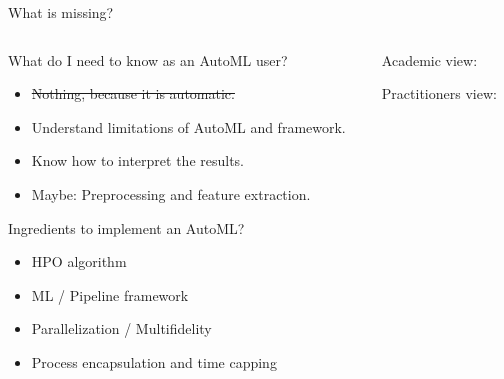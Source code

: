 \begin{frame}{What is missing?}
  \begin{columns}
    \begin{column}{0.5\textwidth}
        What do I need to know as an AutoML user?
        \begin{itemize}
          \item \sout{Nothing, because it is automatic.}
          \item Understand limitations of AutoML and framework.
          \item Know how to interpret the results.
          \item Maybe: Preprocessing and feature extraction.
        \end{itemize}

        \vspace{1em}

        Ingredients to implement an AutoML?
        \begin{itemize}
          \item HPO algorithm
          \item ML / Pipeline framework 
          \item Parallelization / Multifidelity
          \item Process encapsulation and time capping 
        \end{itemize}
    \end{column}%
    \begin{column}{0.5\textwidth}
      \begin{center}
        Academic view:
        \scalebox{0.45}{
          
        }

        \vspace{1em}

        Practitioners view:
        \scalebox{0.45}{
          
        }
      \end{center}
    \end{column}
  \end{columns}
\end{frame}


